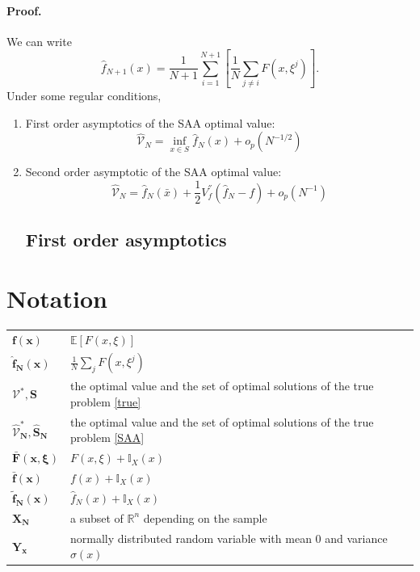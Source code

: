 \documentclass[a4pper,11pt]{article}
\newcommand{\be}{\mathbb E}
\begin{document}
\paragraph{Proof.} We can write
$$
	\hat f_{N+1}(x)=\frac{1}{N+1}\sum_{i=1}^{N+1}[\frac{1}{N}\sum_{j\ne i}F(x,\xi^j)].
$$
Under some regular conditions,
\begin{enumerate}
	\item First order asymptotics of the SAA optimal value:
	      $$
		      \hat {\mathcal V}_N = \inf_{x\in S}\hat f_N(x)+o_p(N^{-1/2})
	      $$
	\item Second order asymptotic of the SAA optimal value:
	      $$
		      \hat {\mathcal V}_N = \hat f_N(\bar x)+\frac{1}{2}V^{''}_f(\hat f_N-f)+o_p(N^{-1})
	      $$
	      \subsection{First order asymptotics}
\end{enumerate}




\section{Notation}
\begin{table}[!h]
	\begin{tabular}{ll}
		$\bm{f(x)}$                           & $\be [F(x,\xi)]$                                                                    \\
		$\bm{\hat f_N(x)}$                    & $ \frac{1}{N}\sum_{j}F(x,\xi^j)$                                                    \\
		$\bm{\mathcal V^*, S}$                & the optimal value and the set of optimal solutions of the true problem \eqref{true} \\
		$\bm{\hat{\mathcal V}^*_N, \hat S_N}$ & the optimal value and the set of optimal solutions of the true problem \eqref{SAA}  \\
		$\bm{\bar{F}(x,\xi)}$                 & $  F(x,\xi)+\mathbb I_X(x)$                                                         \\
		$\bm{\bar f(x)}$                      & $  f(x)+\mathbb I_X(x)$                                                             \\
		$\bm{\tilde f_N(x)}$                  & $ \hat f_N(x)+\mathbb I_X(x)$                                                       \\
		$\bm{X_N}$                            & a subset of $\mathbb R^n$ depending on the sample                                   \\
		$\bm{Y_x}$                            & normally distributed random variable with mean $0$ and variance $\sigma(x)$         \\
	\end{tabular}
\end{table}
\end{document}
